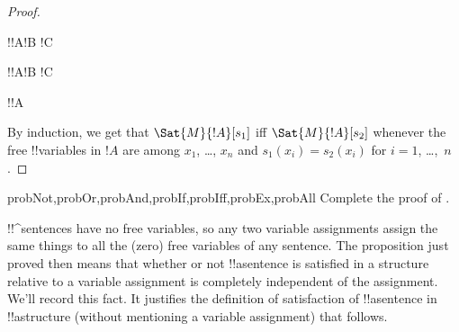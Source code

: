 \begin{proof}
\begin{enumerate}

  


  
    \indcase!{!A}{!B \land !C}{}


  


  
    \indcase!{!A}{!B \lif !C}{}




  


  
    \indcase!{!A}{\lforall[x][!B]}{}
\end{enumerate}
By induction, we get that $\Sat{M}{!A}[s_1]$ iff $\Sat{M}{!A}[s_2]$
whenever the free !!{variable}s in $!A$ are among $x_1$, \dots, $x_n$
and $s_1(x_i)=s_2(x_i)$ for $i = 1$, \dots,~$n$.
\end{proof}

\begin{probtag}{probNot,probOr,probAnd,probIf,probIff,probEx,probAll}
Complete the proof of .
\end{probtag}

\begin{explain}
!!^{sentence}s have no free variables, so any two variable assignments  
assign the same things to all the (zero) free variables of any
sentence. The proposition just proved then means that whether or not
!!a{sentence} is satisfied in a structure relative to a variable
assignment is completely independent of the assignment. We'll record
this fact. It justifies the definition of satisfaction of
!!a{sentence} in !!a{structure} (without mentioning a variable
assignment) that follows.
\end{explain}

